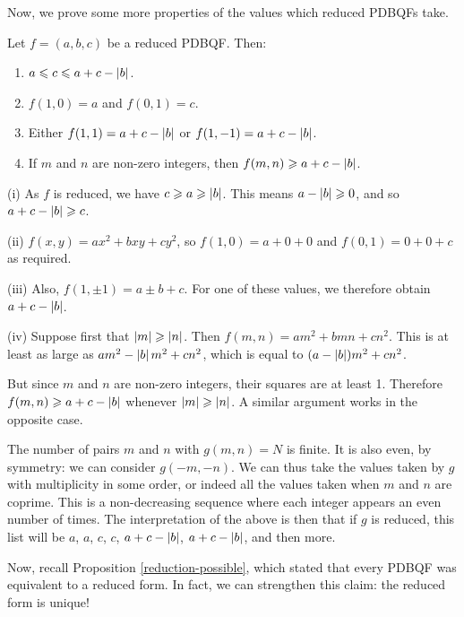 \documentclass{article}
\begin{document}
Now, we prove some more properties of the values which reduced PDBQFs take.
\begin{proposition}
    Let $f = (a, b, c)$ be a reduced PDBQF. Then:
    \begin{enumerate}
    	\item[(i)] $a \leqslant c \leqslant a + c - \left\lvert b \right\rvert$.
    	\item[(ii)] $f(1, 0) = a$ and $f(0, 1) = c$.
    	\item[(iii)] Either $f(1, 1) = a + c - \left\lvert b \right\rvert$ or $f(1, -1) = a + c - \left\lvert b \right\rvert$.
    	\item[(iv)] If $m$ and $n$ are non-zero integers, then $f(m, n) \geqslant a + c - \left\lvert b \right\rvert$.
	\end{enumerate}
\end{proposition}

\begin{prf}
    (i) As $f$ is reduced, we have $c \geqslant a \geqslant \left\lvert b \right\rvert$. This means $a - \left\lvert b \right\rvert \geqslant 0$, and so $a + c - \left\lvert b \right\rvert \geqslant c$.
    
    (ii) $f(x, y) = ax^2 + bxy + cy^2$, so $f(1, 0) = a + 0 + 0$ and $f(0, 1) = 0 + 0 + c$ as required.
    
    (iii) Also, $f(1, \pm 1) = a \pm b + c$. For one of these values, we therefore obtain $a + c - \left\lvert b \right\rvert$.
    
    (iv) Suppose first that $\left\lvert m \right\rvert \geqslant \left\lvert n \right\rvert$. Then $f(m, n) = am^2 + bmn + cn^2$. This is at least as large as $am^2 - \left\lvert b \right\rvert m^2 + cn^2$, which is equal to $(a - \left\lvert b \right\rvert)m^2 + cn^2$.
    
    But since $m$ and $n$ are non-zero integers, their squares are at least 1. Therefore $f(m, n) \geqslant a + c - \left\lvert b \right\rvert$ whenever $\left\lvert m \right\rvert \geqslant \left\lvert n \right\rvert$. A similar argument works in the opposite case.
\end{prf}

\begin{note}
	The number of pairs $m$ and $n$ with $g(m, n) = N$ is finite.
	It is also even, by symmetry: we can consider $g(-m, -n)$.
	We can thus take the values taken by $g$ with multiplicity in some order, or indeed all the values taken when $m$ and $n$ are coprime.
	This is a non-decreasing sequence where each integer appears an even number of times. The interpretation of the above is then that if $g$ is reduced, this list will be $a$, $a$, $c$, $c$, $a+ c - \left\lvert b \right\rvert$, $a+ c - \left\lvert b \right\rvert$, and then more.
\end{note}

Now, recall Proposition \ref{reduction-possible}, which stated that every PDBQF was equivalent to a reduced form. In fact, we can strengthen this claim: the reduced form is unique!
\end{document}
